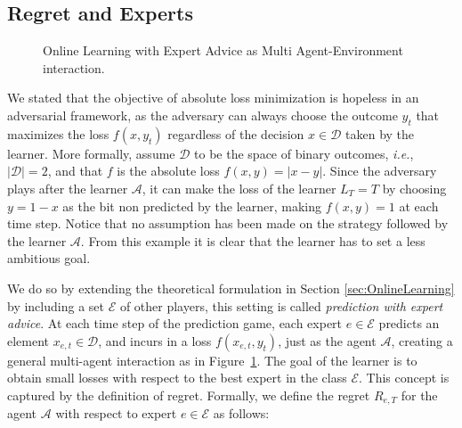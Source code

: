 

\subsection{Regret and Experts}\label{sec:regret_and_experts}
\begin{figure}[!ht]
\centering

\caption{Online Learning with Expert Advice as Multi Agent-Environment interaction.}
\label{fig:OL}
\end{figure}

We stated that the objective of absolute loss minimization is hopeless in an adversarial framework, as the adversary can always choose the outcome $y_t$ that maximizes the loss $f(x,y_t)$ regardless of the decision $x\in\mathcal D$ taken by the learner. More formally, assume $\mathcal D$ to be the space of binary outcomes, \emph{i.e.}, $|\mathcal D|=2$, and that $f$ is the absolute loss $f(x,y)=|x - y|$. Since the adversary plays after the learner $\mathcal A$, it can  make the loss of the learner $L_T=T$ by choosing $y=1-x$ as the bit non predicted by the learner, making $f(x,y)=1$ at each time step. Notice that no assumption has been made on the strategy followed by the learner $\mathcal A$.
From this example it is clear that the learner has to set a less ambitious goal.

We do so by extending the theoretical formulation in Section \ref{sec:OnlineLearning} by including a set $\mathcal E$ of other players, this setting is called \emph{prediction with expert advice}. At each time step of the prediction game, each expert $e\in\mathcal E$ predicts an element $x_{e,t}\in\mathcal D$, and incurs in a loss $f(x_{e,t},y_t)$, just as the agent $\mathcal A$, creating a general multi-agent interaction as in Figure~\ref{fig:OL}. 
The goal of the learner is to obtain small losses with respect to the best expert in the class $\mathcal E$. This concept is captured by the definition of regret.
Formally, we define the regret $R_{e,T}$ for the agent $\mathcal A$ with respect to expert $e\in\mathcal E$ as follows:

